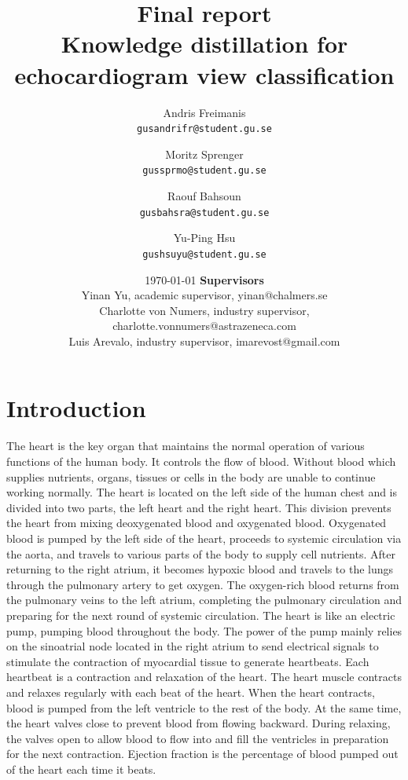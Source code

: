 \documentclass{article}
\title{Final report \\ Knowledge distillation for echocardiogram view classification}
\author{
  Andris Freimanis\\
  \texttt{gusandrifr@student.gu.se}
  \and
  Moritz Sprenger\\
  \texttt{gussprmo@student.gu.se}
  \and
  Raouf Bahsoun\\
  \texttt{gusbahsra@student.gu.se}
  \and
  Yu-Ping Hsu\\
  \texttt{gushsuyu@student.gu.se}
}
\date{\today \endgraf\bigskip\vspace*{12cm}
	\textbf{Supervisors}\\
	\centering Yinan Yu, academic supervisor, yinan@chalmers.se \\
	Charlotte von Numers, industry supervisor, charlotte.vonnumers@astrazeneca.com \\
	Luis Arevalo, industry supervisor, imarevost@gmail.com}
\begin{document}
\maketitle

\newpage
\tableofcontents
\newpage
\section{Introduction}
The heart is the key organ that maintains the normal operation of various functions of the human body. It controls the flow of blood. Without blood which supplies nutrients, organs, tissues or cells in the body are unable to continue working normally. The heart is located on the left side of the human chest and is divided into two parts, the left heart and the right heart. This division prevents the heart from mixing deoxygenated blood and oxygenated blood. Oxygenated blood is pumped by the left side of the heart, proceeds to systemic circulation via the aorta, and travels to various parts of the body to supply cell nutrients. After returning to the right atrium, it becomes hypoxic blood and travels to the lungs through the pulmonary artery to get oxygen. The oxygen-rich blood returns from the pulmonary veins to the left atrium, completing the pulmonary circulation and preparing for the next round of systemic circulation. The heart is like an electric pump, pumping blood throughout the body. The power of the pump mainly relies on the sinoatrial node located in the right atrium to send electrical signals to stimulate the contraction of myocardial tissue to generate heartbeats. Each heartbeat is a contraction and relaxation of the heart. The heart muscle contracts and relaxes regularly with each beat of the heart. When the heart contracts, blood is pumped from the left ventricle to the rest of the body. At the same time, the heart valves close to prevent blood from flowing backward. During relaxing, the valves open to allow blood to flow into and fill the ventricles in preparation for the next contraction. Ejection fraction is the percentage of blood pumped out of the heart each time it beats. 
\end{document}
